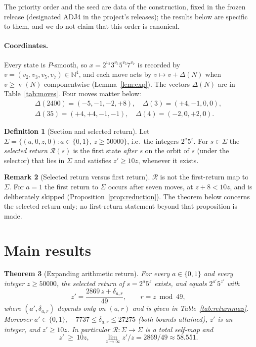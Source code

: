 \documentclass[11pt,a4paper]{article}
\newtheorem{theorem}{Theorem}[section]
\theoremstyle{definition}
\newtheorem{definition}[theorem]{Definition}
\newtheorem{remark}[theorem]{Remark}
\newcommand{\N}{\mathbb{N}}
\newcommand{\Sig}{\Sigma}
\newcommand{\Ret}{\mathcal{R}}
\DeclareMathOperator{\vp}{v}
\begin{document}
The priority order and the seed are data of the construction, fixed in the frozen release \cite{adj4-frozen} (designated ADJ4 in the project's releases); the results below are specific to them, and we do not claim that this order is canonical.

\paragraph{Coordinates.} Every state is $P$-smooth, so $x=2^{v_2}3^{v_3}5^{v_5}7^{v_7}$ is recorded by $v=(v_2,v_3,v_5,v_7)\in\N^4$, and each move acts by $v\mapsto v+\Delta(N)$ when $v\ge \vp(N)$ componentwise (Lemma~\ref{lem:exp}). The vectors $\Delta(N)$ are in Table~\ref{tab:moves}. Four moves matter below:
\[
\begin{gathered}
\Delta(2400)=(-5,-1,-2,+8),\quad \Delta(3)=(+4,-1,0,0),\\
\Delta(35)=(+4,+4,-1,-1),\quad \Delta(4)=(-2,0,+2,0).
\end{gathered}
\]

\begin{definition}[Section and selected return]\label{def:section}
Let $\Sig=\{(a,0,z,0): a\in\{0,1\},\ z\ge 50000\}$, i.e.\ the integers $2^a5^z$. For $s\in\Sig$ the \emph{selected return} $\Ret(s)$ is the first state \emph{after} $s$ on the orbit of $s$ (under the selector) that lies in $\Sig$ and satisfies $z'\ge10z$, whenever it exists.
\end{definition}

\begin{remark}[Selected return versus first return]\label{rem:first}
$\Ret$ is not the first-return map to $\Sig$. For $a=1$ the first return to $\Sig$ occurs after seven moves, at $z+8<10z$, and is deliberately skipped (Proposition~\ref{prop:reduction}). The theorem below concerns the selected return only; no first-return statement beyond that proposition is made.
\end{remark}

\section{Main results}\label{sec:results}

\begin{theorem}[Expanding arithmetic return]\label{thm:return}
For every $a\in\{0,1\}$ and every integer $z\ge50000$, the selected return of $s=2^a5^z$ exists, and equals $2^{a'}5^{z'}$ with
\begin{equation}\label{eq:return}
z'=\frac{2869\,z+\delta_{a,r}}{49},\qquad r=z \bmod 49,
\end{equation}
where $(a',\delta_{a,r})$ depends only on $(a,r)$ and is given in Table~\ref{tab:returnmap}. Moreover $a'\in\{0,1\}$, $-7737\le\delta_{a,r}\le27275$ (both bounds attained), $z'$ is an integer, and $z'\ge10z$. In particular $\Ret:\Sig\to\Sig$ is a total self-map and
\[
z'\ \ge\ 10z,\qquad \lim_{z\to\infty} z'/z=2869/49\approx 58.551.
\]
\end{theorem}
\end{document}
